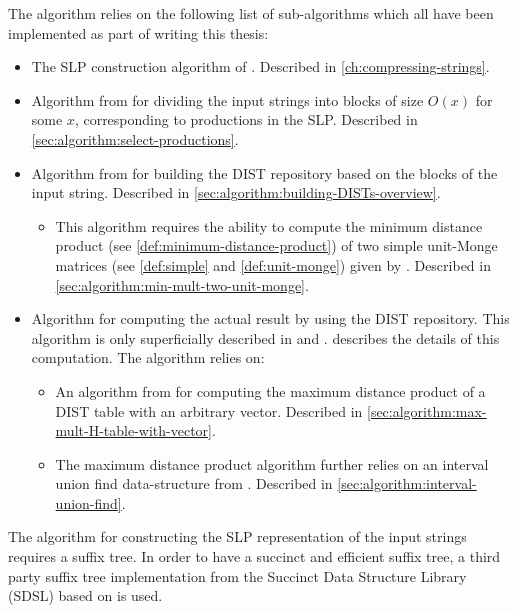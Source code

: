 \documentclass[twoside,11pt,openright]{report}
\begin{document}
The algorithm relies on the following list of sub-algorithms which all have been implemented as part of writing this thesis:
\begin{itemize}
  \item The SLP construction algorithm of \cite{Rytter2003211}. Described in \cref{ch:compressing-strings}.
  \item Algorithm from \cite{DBLP:journals/corr/abs-1004-1194} for dividing the input strings into blocks of size $O(x)$ for some $x$, corresponding to productions in the SLP. Described in \cref{sec:algorithm:select-productions}.
  \item Algorithm from \cite{DBLP:journals/corr/abs-1004-1194} for building the DIST repository based on the blocks of the input string. Described in \cref{sec:algorithm:building-DISTs-overview}.
    \begin{itemize}
      \item This algorithm requires the ability to compute the minimum distance product (see \cref{def:minimum-distance-product}) of two simple unit-Monge matrices (see \cref{def:simple} and \cref{def:unit-monge}) given by \cite{Tiskin:2010:FDM:1873601.1873704}. Described in \cref{sec:algorithm:min-mult-two-unit-monge}.
    \end{itemize}
  \item Algorithm for computing the actual result by using the DIST repository. This algorithm is only superficially described in \cite{Gawrychowski:2012:FAC:2422024.2422048} and \cite{DBLP:journals/corr/abs-0707-3619}.  describes the details of this computation. The algorithm relies on:
    \begin{itemize}
      \item An algorithm from \cite{Gawrychowski:2012:FAC:2422024.2422048} for computing the maximum distance product of a DIST table with an arbitrary vector. Described in \cref{sec:algorithm:max-mult-H-table-with-vector}.
      \item The maximum distance product algorithm further relies on an interval union find data-structure from \cite{Itai06lineartime}. Described in \cref{sec:algorithm:interval-union-find}.
    \end{itemize}
\end{itemize}
The algorithm for constructing the SLP representation of the input strings requires a suffix tree. In order to have a succinct and efficient suffix tree, a third party suffix tree implementation from the Succinct Data Structure Library (SDSL) \cite{SDSL} based on \cite{OHL:FIS:GOG:2010} is used.
\end{document}
